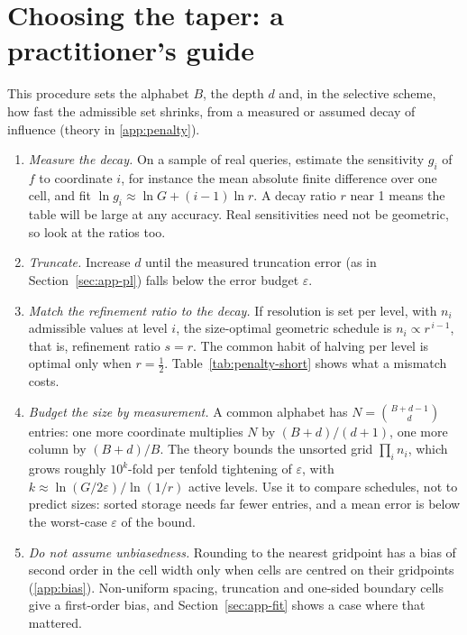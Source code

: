 \documentclass[preprint,12pt]{elsarticle}
\newcommand{\eps}{\varepsilon}
\begin{document}
\section{Choosing the taper: a practitioner's guide}\label{sec:taper}

This procedure sets the alphabet $B$, the depth $d$ and, in the selective scheme, how fast the admissible set shrinks, from a measured or assumed decay of influence (theory in \ref{app:penalty}).

\begin{enumerate}
\item \emph{Measure the decay.} On a sample of real queries, estimate the
sensitivity $g_i$ of $f$ to coordinate $i$, for instance the mean absolute
finite difference over one cell, and fit $\ln g_i\approx \ln G+(i-1)\ln r$. A
decay ratio $r$ near 1 means the table will be large at any accuracy. Real
sensitivities need not be geometric, so look at the ratios too.
\item \emph{Truncate.} Increase $d$ until the measured truncation error (as in
Section~\ref{sec:app-pl}) falls below the error budget $\eps$.
\item \emph{Match the refinement ratio to the decay.} If resolution is set per
level, with $n_i$ admissible values at level $i$, the size-optimal geometric
schedule is $n_i\propto r^{\,i-1}$, that is, refinement ratio $s=r$. The common
habit of halving per level is optimal only when $r=\tfrac12$.
Table~\ref{tab:penalty-short} shows what a mismatch costs.
\item \emph{Budget the size by measurement.} A common alphabet has
$N=\binom{B+d-1}{d}$ entries: one more coordinate multiplies $N$ by $(B+d)/(d+1)$,
one more column by $(B+d)/B$. The theory bounds the unsorted grid $\prod_i n_i$, which grows roughly $10^{k}$-fold per tenfold tightening of $\eps$, with $k\approx\ln(G/2\eps)/\ln(1/r)$ active levels. Use it to compare schedules, not to predict sizes: sorted storage needs far fewer entries, and a mean error is below the worst-case $\eps$ of the bound.
\item \emph{Do not assume unbiasedness.} Rounding to the nearest gridpoint has a
bias of second order in the cell width only when cells are centred on their
gridpoints (\ref{app:bias}). Non-uniform spacing, truncation and one-sided boundary cells give a first-order bias, and Section~\ref{sec:app-fit} shows a case where that mattered.
\end{enumerate}
\end{document}
